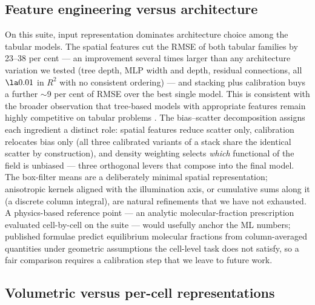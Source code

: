 \documentclass[fleqn,usenatbib]{rasti}
\newcommand{\Rsq}{R^2}
\begin{document}
\subsection{Feature engineering versus architecture}

On this suite, input representation dominates architecture choice among
the tabular models. The spatial features cut the RMSE of both tabular
families by 23--38 per cent --- an improvement several times larger than
any architecture variation we tested (tree depth, MLP width and depth,
residual connections, all \(\la 0.01\) in \(\Rsq\) with no consistent
ordering) --- and stacking plus calibration buys a further \(\sim\)9 per
cent of RMSE over the best single model. This is consistent with the
broader observation that tree-based models with appropriate features
remain highly competitive on tabular problems \citep{Grinsztajn2022}.
The bias--scatter decomposition assigns each ingredient a distinct role:
spatial features reduce scatter only, calibration relocates bias only
(all three calibrated variants of a stack share the identical scatter by
construction), and density weighting selects \emph{which} functional of
the field is unbiased --- three orthogonal levers that compose into the
final model. The box-filter means are a deliberately minimal spatial
representation; anisotropic kernels aligned with the illumination axis,
or cumulative sums along it (a discrete column integral), are natural
refinements that we have not exhausted. A physics-based reference point
--- an analytic molecular-fraction prescription
\citep[e.g.][]{Krumholz2009,Gnedin2011,Bialy2016} evaluated
cell-by-cell on the suite --- would usefully anchor the ML numbers;
published formulae predict equilibrium molecular fractions from
column-averaged quantities under geometric assumptions the cell-level
task does not satisfy, so a fair comparison requires a calibration step
that we leave to future work.

\subsection{Volumetric versus per-cell representations}
\end{document}
